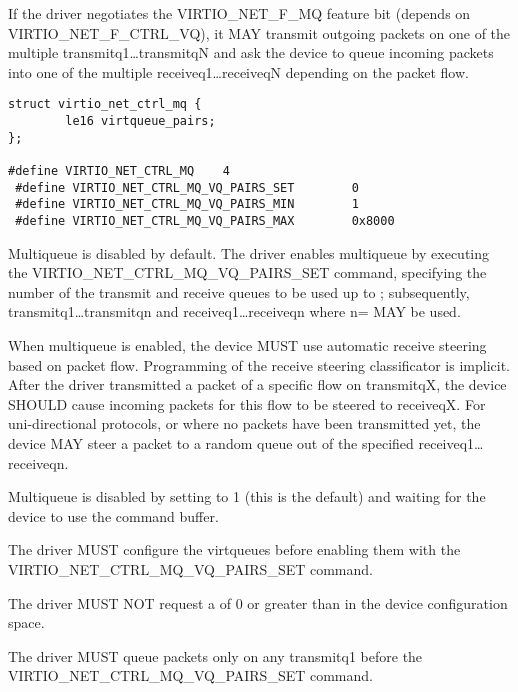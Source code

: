 If the driver negotiates the VIRTIO_NET_F_MQ feature bit (depends
on VIRTIO_NET_F_CTRL_VQ), it MAY transmit outgoing packets on one
of the multiple transmitq1\ldots transmitqN and ask the device to
queue incoming packets into one of the multiple receiveq1\ldots receiveqN
depending on the packet flow.

\begin{lstlisting}
struct virtio_net_ctrl_mq {
        le16 virtqueue_pairs;
};

#define VIRTIO_NET_CTRL_MQ    4
 #define VIRTIO_NET_CTRL_MQ_VQ_PAIRS_SET        0
 #define VIRTIO_NET_CTRL_MQ_VQ_PAIRS_MIN        1
 #define VIRTIO_NET_CTRL_MQ_VQ_PAIRS_MAX        0x8000
\end{lstlisting}

Multiqueue is disabled by default. The driver enables multiqueue by
executing the VIRTIO_NET_CTRL_MQ_VQ_PAIRS_SET command, specifying
the number of the transmit and receive queues to be used up to
; subsequently,
transmitq1\ldots transmitqn and receiveq1\ldots receiveqn where
n= MAY be used.

When multiqueue is enabled, the device MUST use automatic receive steering
based on packet flow. Programming of the receive steering
classificator is implicit. After the driver transmitted a packet of a specific
flow on transmitqX, the device SHOULD cause incoming packets for this flow to
be steered to receiveqX. For uni-directional protocols, or where
no packets have been transmitted yet, the device MAY steer a packet
to a random queue out of the specified receiveq1\ldots receiveqn.

Multiqueue is disabled by setting  to 1 (this is
the default) and waiting for the device to use the command buffer.


The driver MUST configure the virtqueues before enabling them with the 
VIRTIO_NET_CTRL_MQ_VQ_PAIRS_SET command.

The driver MUST NOT request a  of 0 or
greater than  in the device configuration space.

The driver MUST queue packets only on any transmitq1 before the 
VIRTIO_NET_CTRL_MQ_VQ_PAIRS_SET command.

